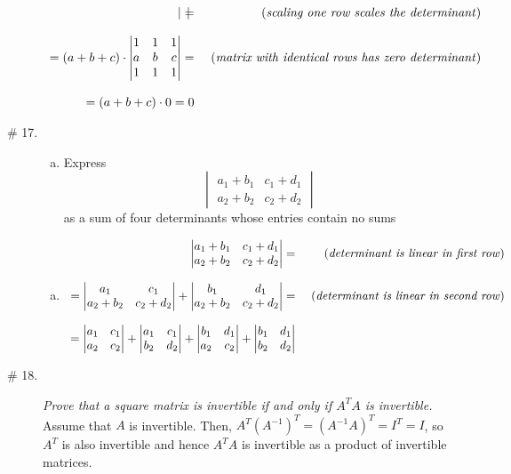 \documentclass[8pt]{article} %
\begin{document}
\begin{description}
{\[\begin{array}{rr}
\begin{vmatrix}
		\end{vmatrix}= &\mbox{ (\textit{scaling one row scales the determinant})}\\\\
		=(a+b+c)\cdot\begin{vmatrix}1&1&1\\a&b&c\\1&1&1
		\end{vmatrix}= &\mbox{ (\textit{matrix with identical rows has zero determinant})}\\\\
		=(a+b+c)\cdot0=0&\end{array}\]
		}
	\item[\# 17.]{{\it \begin{enumerate}[(a)]
			\item Express\[\begin{vmatrix}a_1+b_1&c_1+d_1\\a_2+b_2&c_2+d_2\end{vmatrix}\] as a sum of four determinants
					whose entries contain no sums
		\end{enumerate}
		}
		\begin{enumerate}[(a)]
			\item 
		\[\begin{array}{rr}
		\begin{vmatrix}a_1+b_1&c_1+d_1\\a_2+b_2&c_2+d_2\end{vmatrix}= &\mbox{ (\textit{determinant is linear in first row})}\\\\
		=\begin{vmatrix}a_1&c_1\\a_2+b_2&c_2+d_2\end{vmatrix}+
		\begin{vmatrix}b_1&d_1\\a_2+b_2&c_2+d_2\end{vmatrix}
			= &\mbox{ (\textit{determinant is linear in second row})}\\\\
		=\begin{vmatrix}a_1&c_1\\a_2&c_2\end{vmatrix}+
		\begin{vmatrix}a_1&c_1\\b_2&d_2\end{vmatrix}+
		\begin{vmatrix}b_1&d_1\\a_2&c_2\end{vmatrix}+
			\begin{vmatrix}b_1&d_1\\b_2&d_2\end{vmatrix}\end{array}
		\]
		\end{enumerate}
		}
	\item[\# 18.]{{\it Prove that a square matrix is invertible if and only if $A^TA$ is invertible.
				}
			Assume that $A$ is invertible. Then, $A^T(A^{-1})^T=(A^{-1}A)^T=I^T=I$, so $A^T$ is also invertible and hence
			$A^TA$ is invertible as a product of invertible matrices.

}
\end{description}
\end{document}
